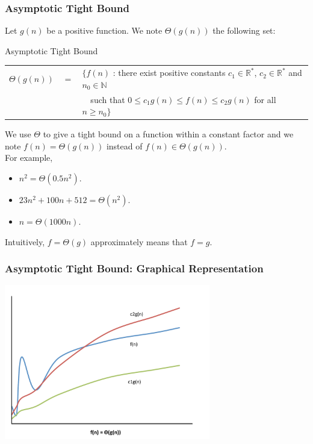 \documentclass{beamer}
\begin{document}
\begin{frame}%
\frametitle{Asymptotic Tight Bound}

\scriptsize

Let $g(n)$ be a positive function. We note $\Theta(g(n))$ the following set:

\begin{block}{Asymptotic Tight Bound}
\begin{tabular}{lcl}
$\Theta(g(n))$ & $=$ & $\{ f(n)$ : there exist positive constants $c_1 \in \mathbb{R}^*$, $c_2 \in \mathbb{R}^*$ and $n_0 \in \mathbb{N}$\\
& & \ \ such that $0 \le c_1g(n) \le f(n) \le c_2g(n)$ for all $n \ge n_0 \}$\\
\end{tabular}
\end{block}

We use $\Theta$ to give a tight bound on a function within a constant factor and we
note $f(n) = \Theta(g(n))$ instead of $f(n) \in \Theta(g(n))$.\\
\vspace{0.3cm}
For example,
\begin{itemize}
\item $n^2 = \Theta(0.5n^2)$.
\item $23n^2 + 100n + 512 = \Theta(n^2)$.
\item $n = \Theta(1000n)$.
\end{itemize}

\vspace{0.3cm}
Intuitively, $f = \Theta(g)$ approximately means that $f = g$.

\end{frame}

\begin{frame}[containsverbatim]
\frametitle{Asymptotic Tight Bound: Graphical Representation}

\begin{center}
\includegraphics[width=9cm]{big_theta.pdf}
\end{center}

\end{frame}
\end{document}
